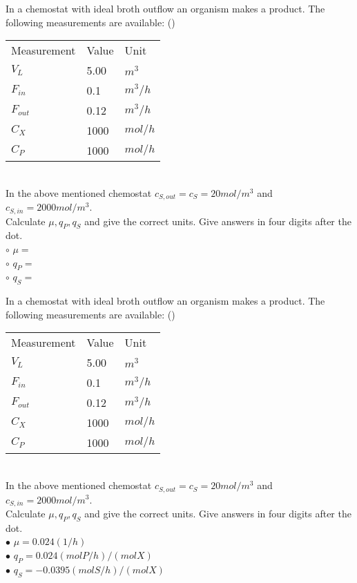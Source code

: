 \documentclass[]{beamer}
\begin{document}
\begin{frame}[shrink] {}
\addtocounter{questions}{1}
\color{blue}
In a chemostat with ideal broth outflow an organism makes a product. The following measurements are available: ()\\
\color{gray}
\begin{tabular}[ ]{l l l}
Measurement & Value & Unit \\
$V_L$ & 5.00 & $m^3$ \\
$F_{in}$ & 0.1 & $m^{3}/h$ \\
$F_{out}$ & 0.12 & $m^{3}/h$ \\
$C_{X}$ & 1000 & $mol/h$ \\
$C_{P}$ & 1000 & $mol/h$ \\
\end{tabular} \\
\color{black}
In the above mentioned chemostat $c_{S,out} = c_{S} =20mol/m^3$ and $c_{S,in} = 2000 mol/m^3$. \\[0.3em]
Calculate $\mu, q_P, q_S$ and give the correct units. Give answers in four digits after the dot. \\
\setlength{\parindent}{-0.4cm}
{\color{red}$\circ$} $\mu=$\\
{\color{red}$\circ$} $q_P=$ \\
{\color{red}$\circ$} $q_S=$ \\
\end{frame}
\begin{frame}[shrink] {}
\addtocounter{answers}{1}
\color{blue}
In a chemostat with ideal broth outflow an organism makes a product. The following measurements are available: ()\\
\color{gray}
\begin{tabular}[ ]{l l l}
Measurement & Value & Unit \\
$V_L$ & 5.00 & $m^3$ \\
$F_{in}$ & 0.1 & $m^{3}/h$ \\
$F_{out}$ & 0.12 & $m^{3}/h$ \\
$C_{X}$ & 1000 & $mol/h$ \\
$C_{P}$ & 1000 & $mol/h$ \\
\end{tabular} \\
\color{black}
In the above mentioned chemostat $c_{S,out} = c_{S} =20mol/m^3$ and $c_{S,in} = 2000 mol/m^3$. \\[0.3em]
Calculate $\mu, q_P, q_S$ and give the correct units. Give answers in four digits after the dot. \\
\setlength{\parindent}{-0.4cm}
{\color{red}$\bullet$} $\mu=0.024(1/h)$ \\
{\color{red}$\bullet$} $q_P=0.024(molP/h)/(molX) $ \\
{\color{red}$\bullet$} $q_S=-0.0395 (molS/h)/(molX)$ \\
\end{frame}
\end{document}
